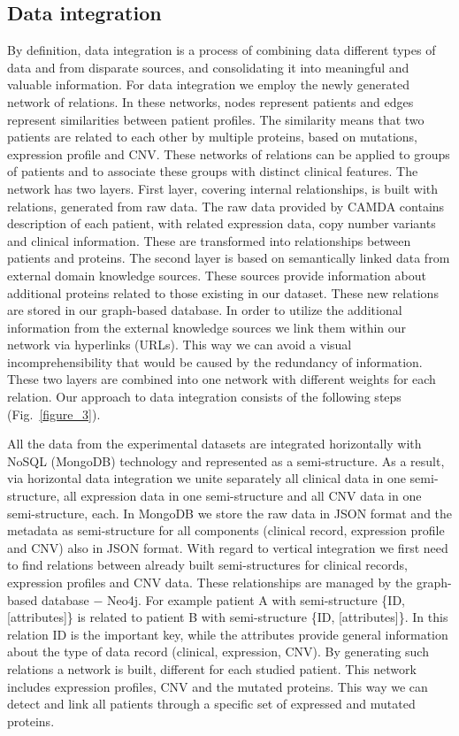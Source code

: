 \documentclass{bmcart}
\begin{document}
\subsection{Data integration}

By definition, data integration is a process of combining data different
types of data and from disparate sources, and consolidating it into
meaningful and valuable information. For data integration we employ the
newly generated network of relations. In these networks, nodes
represent patients and edges represent similarities between patient
profiles. The similarity means that two patients are related to each
other by multiple proteins, based on mutations, expression profile and
CNV. These networks of relations can be applied to groups of patients
and to associate these groups with distinct clinical features. The
network has two layers. First layer, covering internal relationships,
is built with relations, generated from raw data. The raw data provided
by CAMDA contains description of each patient, with related expression
data, copy number variants and clinical information. These are
transformed into relationships between patients and proteins. The
second layer is based on semantically linked data from external domain
knowledge sources. These sources provide information about additional
proteins related to those existing in our dataset. These new relations
are stored in our graph-based database. In order to utilize the
additional information from the external knowledge sources we link them
within our network via  hyperlinks (URLs). This way we can avoid a
visual incomprehensibility that would be caused by the redundancy of
information. These two layers are combined into one network with
different weights for each relation. Our approach to data integration
consists of the following steps (Fig.~\ref{figure_3}).



All the data from the experimental datasets are integrated horizontally
with NoSQL (MongoDB) technology and represented as a semi-structure. As
a result, via horizontal data integration we unite separately all
clinical data in one semi-structure, all expression data in one
semi-structure and all CNV data in one semi-structure, each. In MongoDB
we store the raw data in JSON format and the metadata as semi-structure
for all components (clinical record, expression profile and CNV) also
in JSON format. With regard to vertical integration we first need to
find relations between already built semi-structures for clinical
records, expression profiles and CNV data. These relationships are
managed by the graph-based database $-$ Neo4j. For example patient A
with semi-structure \{ID, [attributes]\} is related to patient B with
semi-structure \{ID, [attributes]\}. In this relation ID is the
important key, while the attributes provide general information about
the type of data record (clinical, expression, CNV). By generating such
relations a network is built, different for each studied patient. This
network includes expression profiles, CNV and the mutated proteins.
This way we can detect and link all patients through a specific set of
expressed and mutated proteins. 
\end{document}
